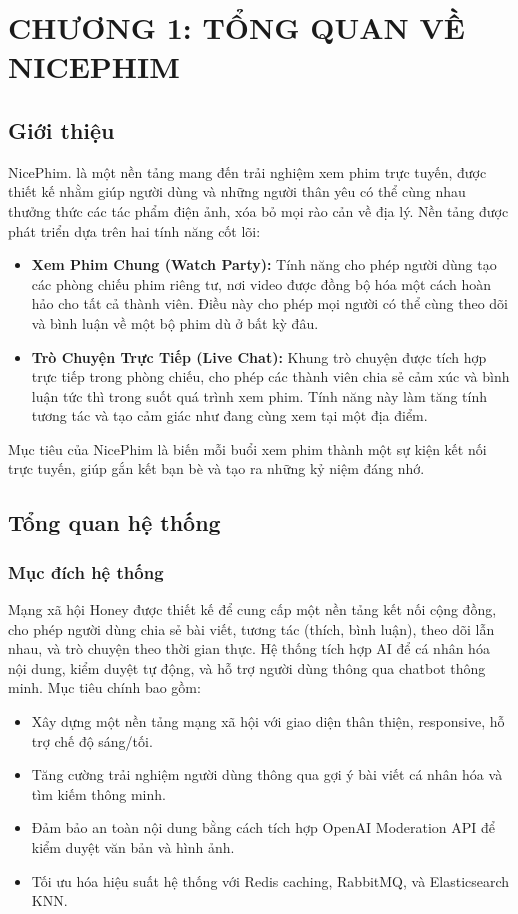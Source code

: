 
\newpage

\section{\textbf{CHƯƠNG 1: TỔNG QUAN VỀ NICEPHIM }}

\subsection{Giới thiệu} 

NicePhim. là một nền tảng mang đến trải nghiệm xem phim trực tuyến, được thiết kế nhằm giúp người dùng và những người thân yêu có thể cùng nhau thưởng thức các tác phẩm điện ảnh, xóa bỏ mọi rào cản về địa lý. Nền tảng được phát triển dựa trên hai tính năng cốt lõi:

\begin{itemize}
\item \textbf{Xem Phim Chung (Watch Party):} Tính năng cho phép người dùng tạo các phòng chiếu phim riêng tư, nơi video được đồng bộ hóa một cách hoàn hảo cho tất cả thành viên. Điều này cho phép mọi người có thể cùng theo dõi và bình luận về một bộ phim dù ở bất kỳ đâu.

\item \textbf{Trò Chuyện Trực Tiếp (Live Chat):} Khung trò chuyện được tích hợp trực tiếp trong phòng chiếu, cho phép các thành viên chia sẻ cảm xúc và bình luận tức thì trong suốt quá trình xem phim. Tính năng này làm tăng tính tương tác và tạo cảm giác như đang cùng xem tại một địa điểm.
\end{itemize}

Mục tiêu của NicePhim là biến mỗi buổi xem phim thành một sự kiện kết nối trực tuyến, giúp gắn kết bạn bè và tạo ra những kỷ niệm đáng nhớ.

\subsection{Tổng quan hệ thống}
\subsubsection{Mục đích hệ thống}
Mạng xã hội Honey được thiết kế để cung cấp một nền tảng kết nối cộng đồng, cho phép người dùng chia sẻ bài viết, tương tác (thích, bình luận), theo dõi lẫn nhau, và trò chuyện theo thời gian thực. Hệ thống tích hợp AI để cá nhân hóa nội dung, kiểm duyệt tự động, và hỗ trợ người dùng thông qua chatbot thông minh. Mục tiêu chính bao gồm:
\begin{itemize}
    \item Xây dựng một nền tảng mạng xã hội với giao diện thân thiện, responsive, hỗ trợ chế độ sáng/tối.
    \item Tăng cường trải nghiệm người dùng thông qua gợi ý bài viết cá nhân hóa và tìm kiếm thông minh.
    \item Đảm bảo an toàn nội dung bằng cách tích hợp OpenAI Moderation API để kiểm duyệt văn bản và hình ảnh.
    \item Tối ưu hóa hiệu suất hệ thống với Redis caching, RabbitMQ, và Elasticsearch KNN.
\end{itemize}

